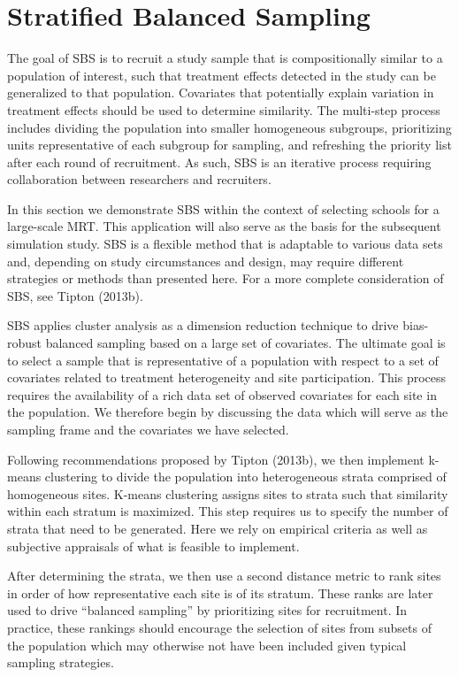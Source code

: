 \documentclass[man,floatsintext]{apa6}
\begin{document}
\hypertarget{stratified-balanced-sampling}{%
\section{Stratified Balanced Sampling}\label{stratified-balanced-sampling}}

The goal of SBS is to recruit a study sample that is compositionally similar to a population of interest, such that treatment effects detected in the study can be generalized to that population. Covariates that potentially explain variation in treatment effects should be used to determine similarity. The multi-step process includes dividing the population into smaller homogeneous subgroups, prioritizing units representative of each subgroup for sampling, and refreshing the priority list after each round of recruitment. As such, SBS is an iterative process requiring collaboration between researchers and recruiters.

In this section we demonstrate SBS within the context of selecting schools for a large-scale MRT. This application will also serve as the basis for the subsequent simulation study. SBS is a flexible method that is adaptable to various data sets and, depending on study circumstances and design, may require different strategies or methods than presented here. For a more complete consideration of SBS, see Tipton (2013b).

SBS applies cluster analysis as a dimension reduction technique to drive bias-robust balanced sampling based on a large set of covariates. The ultimate goal is to select a sample that is representative of a population with respect to a set of covariates related to treatment heterogeneity and site participation. This process requires the availability of a rich data set of observed covariates for each site in the population. We therefore begin by discussing the data which will serve as the sampling frame and the covariates we have selected.

Following recommendations proposed by Tipton (2013b), we then implement k-means clustering to divide the population into heterogeneous strata comprised of homogeneous sites. K-means clustering assigns sites to strata such that similarity within each stratum is maximized. This step requires us to specify the number of strata that need to be generated. Here we rely on empirical criteria as well as subjective appraisals of what is feasible to implement.

After determining the strata, we then use a second distance metric to rank sites in order of how representative each site is of its stratum. These ranks are later used to drive \enquote{balanced sampling} by prioritizing sites for recruitment. In practice, these rankings should encourage the selection of sites from subsets of the population which may otherwise not have been included given typical sampling strategies.
\end{document}
